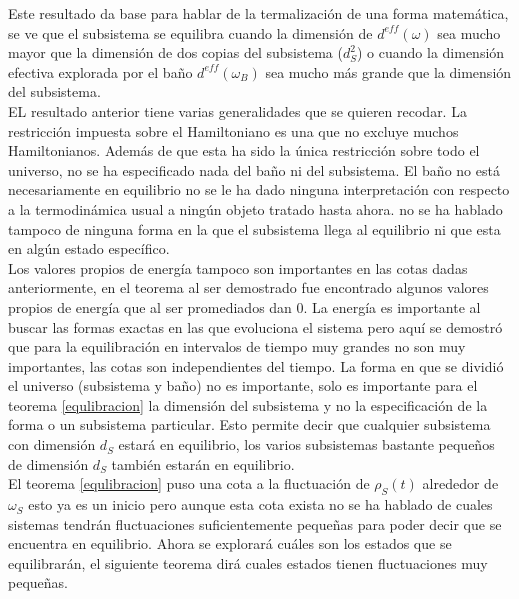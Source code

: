 Este resultado  da base para hablar de la termalización de una forma matemática, se ve que el subsistema se equilibra cuando la dimensión de $d^{eff}(\omega)$ sea mucho mayor que la dimensión de dos copias del subsistema ($d_{S}^{2}$) o cuando la dimensión efectiva explorada por el baño $d^{eff}(\omega_{B})$ sea mucho más grande que la dimensión del subsistema.
\\
EL resultado anterior tiene varias generalidades que se quieren recodar. La restricción impuesta sobre el Hamiltoniano  es una que no excluye muchos Hamiltonianos. Además de que esta ha sido la única restricción sobre todo el universo, no se ha especificado nada del baño ni del subsistema. El baño no está necesariamente en equilibrio no se le ha dado ninguna interpretación con respecto a la termodinámica usual a ningún objeto tratado hasta ahora. no se ha hablado tampoco de ninguna forma en la que el subsistema llega al equilibrio ni que esta en algún estado específico.
\\
Los valores propios de energía tampoco son importantes en las cotas dadas anteriormente, en el teorema al ser demostrado fue encontrado algunos valores propios de energía que al ser promediados dan 0. La energía es importante al buscar las formas exactas en las que evoluciona el sistema pero aquí se demostró que para la equilibración en intervalos de tiempo muy grandes no son muy importantes, las cotas son independientes del tiempo. La forma en que se dividió el universo (subsistema y baño) no es importante, solo es importante para el teorema \ref{equlibracion} la dimensión del subsistema y no la especificación de la forma o un subsistema particular. Esto permite decir que cualquier subsistema con dimensión $d_{S}$ estará en equilibrio, los varios subsistemas bastante pequeños de dimensión $d_{S}$ también estarán en equilibrio.
\\
El teorema \ref{equlibracion} puso una cota a la fluctuación de $\rho_{S}(t)$ alrededor de $\omega_{S}$ esto ya es un inicio pero aunque esta cota exista no se ha hablado de cuales sistemas tendrán fluctuaciones suficientemente pequeñas para poder decir que se encuentra en equilibrio. Ahora se explorará cuáles son los estados que se equilibrarán, el siguiente teorema dirá cuales estados tienen fluctuaciones muy pequeñas.


